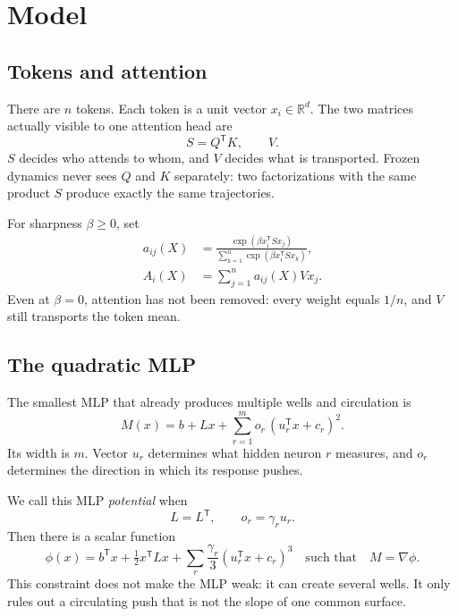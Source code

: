 \documentclass[11pt,a4paper]{article}
\theoremstyle{definition}
\newcommand{\R}{\mathbb R}
\newcommand{\T}{\mathsf T}
\begin{document}
\section{Model}
\label{sec:model}

\subsection{Tokens and attention}

There are $n$ tokens. Each token is a unit vector $x_i\in\R^d$. The two matrices
actually visible to one attention head are
\[
 S=Q^{\T}K,\qquad V.
\]
$S$ decides who attends to whom, and $V$ decides what is transported. Frozen dynamics
never sees $Q$ and $K$ separately: two factorizations with the same product $S$ produce
exactly the same trajectories.

For sharpness $\beta\ge0$, set
\begin{align}
 a_{ij}(X)&=\frac{\exp(\beta x_i^{\T}Sx_j)}
 {\sum_{k=1}^n\exp(\beta x_i^{\T}Sx_k)},\label{eq:weights}\\
 A_i(X)&=\sum_{j=1}^n a_{ij}(X)Vx_j.\label{eq:attention}
\end{align}
Even at $\beta=0$, attention has not been removed: every weight equals $1/n$, and $V$
still transports the token mean.

\subsection{The quadratic MLP}

The smallest MLP that already produces multiple wells and circulation is
\begin{equation}
 M(x)=b+Lx+\sum_{r=1}^{m}o_r\,(u_r^{\T}x+c_r)^2.\label{eq:general-mlp}
\end{equation}
Its width is $m$. Vector $u_r$ determines what hidden neuron $r$ measures, and $o_r$
determines the direction in which its response pushes.

We call this MLP \emph{potential} when
\begin{equation}
 L=L^{\T},\qquad o_r=\gamma_r u_r.\label{eq:potential-constraint}
\end{equation}
Then there is a scalar function
\begin{equation}
 \phi(x)=b^{\T}x+\tfrac12x^{\T}Lx+
 \sum_r\frac{\gamma_r}{3}(u_r^{\T}x+c_r)^3
 \quad\text{such that}\quad M=\nabla\phi.\label{eq:mlp-potential}
\end{equation}
This constraint does not make the MLP weak: it can create several wells. It only rules
out a circulating push that is not the slope of one common surface.
\end{document}
